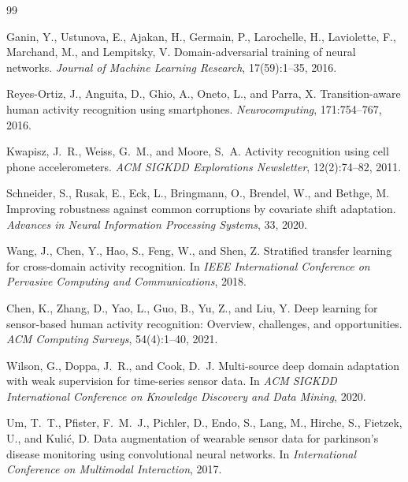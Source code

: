 \documentclass[12pt]{article}
\begin{document}

\begin{thebibliography}{99}

Ganin, Y., Ustunova, E., Ajakan, H., Germain, P., Larochelle, H., Laviolette, F., Marchand, M., and Lempitsky, V.
\newblock Domain-adversarial training of neural networks.
\newblock \emph{Journal of Machine Learning Research}, 17(59):1--35, 2016.

Reyes-Ortiz, J., Anguita, D., Ghio, A., Oneto, L., and Parra, X.
\newblock Transition-aware human activity recognition using smartphones.
\newblock \emph{Neurocomputing}, 171:754--767, 2016.

Kwapisz, J.~R., Weiss, G.~M., and Moore, S.~A.
\newblock Activity recognition using cell phone accelerometers.
\newblock \emph{ACM SIGKDD Explorations Newsletter}, 12(2):74--82, 2011.

Schneider, S., Rusak, E., Eck, L., Bringmann, O., Brendel, W., and Bethge, M.
\newblock Improving robustness against common corruptions by covariate shift adaptation.
\newblock \emph{Advances in Neural Information Processing Systems}, 33, 2020.

Wang, J., Chen, Y., Hao, S., Feng, W., and Shen, Z.
\newblock Stratified transfer learning for cross-domain activity recognition.
\newblock In \emph{IEEE International Conference on Pervasive Computing and Communications}, 2018.

Chen, K., Zhang, D., Yao, L., Guo, B., Yu, Z., and Liu, Y.
\newblock Deep learning for sensor-based human activity recognition: Overview, challenges, and opportunities.
\newblock \emph{ACM Computing Surveys}, 54(4):1--40, 2021.

Wilson, G., Doppa, J.~R., and Cook, D.~J.
\newblock Multi-source deep domain adaptation with weak supervision for time-series sensor data.
\newblock In \emph{ACM SIGKDD International Conference on Knowledge Discovery and Data Mining}, 2020.

Um, T.~T., Pfister, F.~M.~J., Pichler, D., Endo, S., Lang, M., Hirche, S., Fietzek, U., and Kuli{\'c}, D.
\newblock Data augmentation of wearable sensor data for parkinson's disease monitoring using convolutional neural networks.
\newblock In \emph{International Conference on Multimodal Interaction}, 2017.


\end{thebibliography}
\end{document}
